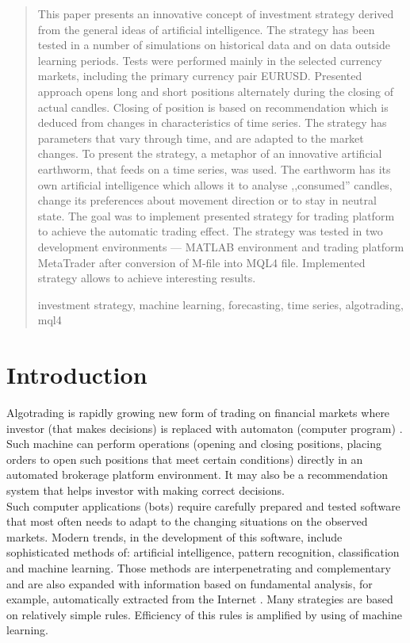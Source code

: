 \documentclass[runningheads,a4paper]{llncs}
\newcommand{\keywords}[1]{\par\addvspace\baselineskip
\noindent\keywordname\enspace\ignorespaces#1}
\begin{document}
\begin{abstract}
This paper presents an innovative concept of investment strategy derived from the general ideas of artificial intelligence. The strategy has been tested in a number of simulations on historical data and on data outside learning periods. Tests were performed mainly in the selected currency markets, including the primary currency pair EURUSD. Presented approach opens long and short positions alternately during the closing of actual candles. Closing of position is based on recommendation which is deduced from changes in characteristics of time series. The strategy has parameters that vary through time, and are adapted to the market changes. To present the strategy, a metaphor of an innovative artificial earthworm, that feeds on a time series, was used. The earthworm has its own artificial intelligence which allows it to analyse ,,consumed'' candles, change its preferences about movement direction or to stay in neutral state. The goal was to implement presented strategy for trading platform to achieve the automatic trading effect.  The strategy was tested in two development environments --- MATLAB environment and trading platform MetaTrader after conversion of M-file into MQL4 file. Implemented strategy allows to achieve interesting results.
\keywords{investment strategy, machine learning, forecasting, time series, algotrading, mql4}
\end{abstract}


\section{Introduction}

Algotrading is rapidly growing new form of trading on financial markets where investor (that makes decisions) is replaced with automaton (computer program) \cite{Leshik2011}\cite{Wilinski2014}. Such machine can perform operations (opening and closing positions, placing orders to open such positions that meet certain conditions) directly in an automated brokerage platform environment. It may also be a recommendation system that helps investor with making correct decisions.\\

Such computer applications (bots) require carefully prepared and tested software that most often needs to adapt to the changing situations on the observed markets. Modern trends, in the development of this software, include sophisticated methods of: artificial intelligence, pattern recognition, classification and machine learning\cite{Leshik2011}\cite{Wilinski}\cite{wang}\cite{sinclare}. Those methods are interpenetrating and complementary and are also expanded with information based on fundamental analysis, for example, automatically extracted from the Internet \cite{elder}\cite{Wilinski2014}\cite{Schwager1996}. Many strategies are based on relatively simple rules. Efficiency of this rules is amplified by using of machine learning\cite{Wilinski}\cite{person}\cite{tian}\cite{krutsinger}\cite{lewis}\cite{murphy}.\\
\end{document}
